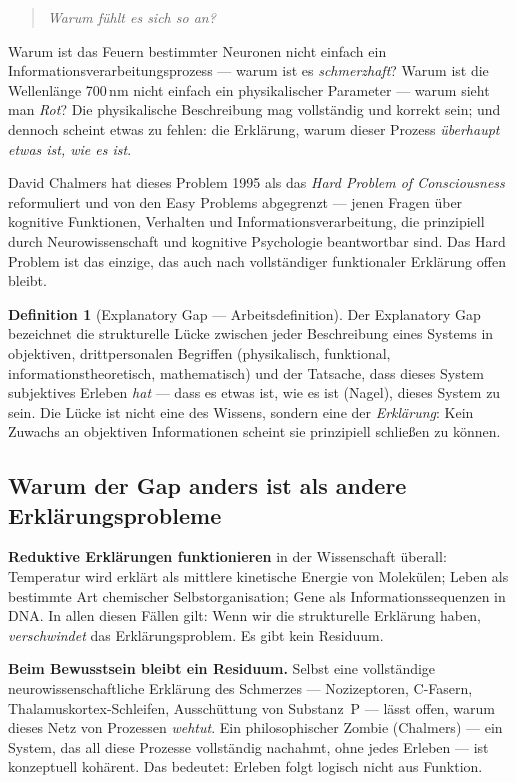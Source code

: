 \documentclass[11pt,a4paper]{article}
\theoremstyle{plain}
\theoremstyle{definition}
\newtheorem{definition}{Definition}[section]
\begin{document}
\begin{quote}
\emph{Warum f\"{u}hlt es sich so an?}
\end{quote}

Warum ist das Feuern bestimmter Neuronen nicht einfach ein Informationsverarbeitungsprozess
--- warum ist es \emph{schmerzhaft}? Warum ist die Wellenl\"{a}nge 700\,nm nicht einfach
ein physikalischer Parameter --- warum sieht man \emph{Rot}? Die physikalische Beschreibung
mag vollst\"{a}ndig und korrekt sein; und dennoch scheint etwas zu fehlen: die Erkl\"{a}rung,
warum dieser Prozess \emph{\"{u}berhaupt etwas ist, wie es ist}.

David Chalmers hat dieses Problem 1995 als das \emph{Hard Problem of Consciousness}
reformuliert und von den \glqq{}Easy Problems\grqq{} abgegrenzt --- jenen Fragen \"{u}ber
kognitive Funktionen, Verhalten und Informationsverarbeitung, die prinzipiell durch
Neurowissenschaft und kognitive Psychologie beantwortbar sind. Das Hard Problem ist das
einzige, das auch nach vollst\"{a}ndiger funktionaler Erkl\"{a}rung offen bleibt.

\begin{definition}[Explanatory Gap --- Arbeitsdefinition]
Der Explanatory Gap bezeichnet die strukturelle L\"{u}cke zwischen jeder Beschreibung
eines Systems in objektiven, drittpersonalen Begriffen (physikalisch, funktional,
informationstheoretisch, mathematisch) und der Tatsache, dass dieses System subjektives
Erleben \emph{hat} --- dass es \glqq{}etwas ist, wie es ist\grqq{} (Nagel), dieses System
zu sein. Die L\"{u}cke ist nicht eine des Wissens, sondern eine der \emph{Erkl\"{a}rung}:
Kein Zuwachs an objektiven Informationen scheint sie prinzipiell schlie\ss{}en zu
k\"{o}nnen.
\end{definition}

\subsection{Warum der Gap anders ist als andere Erkl\"{a}rungsprobleme}

\textbf{Reduktive Erkl\"{a}rungen funktionieren} in der Wissenschaft \"{u}berall: Temperatur
wird erkl\"{a}rt als mittlere kinetische Energie von Molek\"{u}len; Leben als bestimmte
Art chemischer Selbstorganisation; Gene als Informationssequenzen in DNA. In allen diesen
F\"{a}llen gilt: Wenn wir die strukturelle Erkl\"{a}rung haben, \emph{verschwindet} das
Erkl\"{a}rungsproblem. Es gibt kein Residuum.

\textbf{Beim Bewusstsein bleibt ein Residuum.} Selbst eine vollst\"{a}ndige
neurowissenschaftliche Erkl\"{a}rung des Schmerzes --- Nozizeptoren, C-Fasern,
Thalamuskortex-Schleifen, Aussch\"{u}ttung von Substanz~P --- l\"{a}sst offen, warum
dieses Netz von Prozessen \emph{wehtut}. Ein philosophischer Zombie (Chalmers) --- ein
System, das all diese Prozesse vollst\"{a}ndig nachahmt, ohne jedes Erleben --- ist
konzeptuell koh\"{a}rent. Das bedeutet: Erleben folgt logisch nicht aus Funktion.
\end{document}
